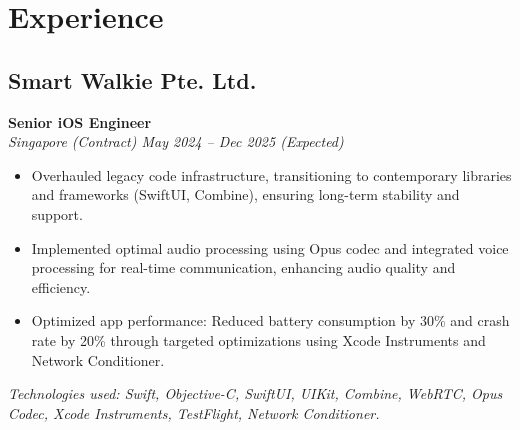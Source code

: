\documentclass[10pt,letterpaper]{article} %
\newcommand{\jobDetailsLine}[1]{\noindent\textit{#1}\par\vspace{0.5ex}}
\begin{document}
\section{Experience}

\subsection*{Smart Walkie Pte. Ltd.}
\noindent\textbf{Senior iOS Engineer} \\
\jobDetailsLine{Singapore (Contract) \textbullet{} May 2024 – Dec 2025 (Expected)}
\begin{itemize}
    \item Overhauled legacy code infrastructure, transitioning to contemporary libraries and frameworks (SwiftUI, Combine), ensuring long-term stability and support.
    \item Implemented optimal audio processing using Opus codec and integrated voice processing for real-time communication, enhancing audio quality and efficiency.
    \item Optimized app performance: Reduced battery consumption by 30\% and crash rate by 20\% through targeted optimizations using Xcode Instruments and Network Conditioner.
\end{itemize}
\textit{Technologies used: Swift, Objective-C, SwiftUI, UIKit, Combine, WebRTC, Opus Codec, Xcode Instruments, TestFlight, Network Conditioner.}
\vspace{1ex}
\end{document}
